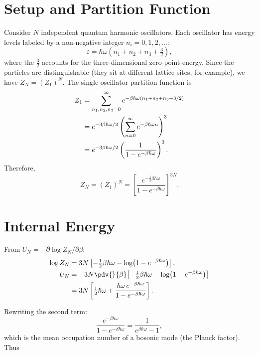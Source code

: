 \section{Setup and Partition Function}

Consider $N$ independent quantum harmonic oscillators.  Each oscillator has energy levels
labeled by a non-negative integer $n_i = 0, 1, 2, \ldots$:
\begin{equation}
    \varepsilon = \hbar\omega\!\left(n_1 + n_2 + n_3 + \tfrac{3}{2}\right),
\end{equation}
where the $\tfrac{3}{2}$ accounts for the three-dimensional zero-point energy.  Since the
particles are distinguishable (they sit at different lattice sites, for example), we have
$Z_N = (Z_1)^N$.  The single-oscillator partition function is
\begin{align}
    Z_1 &= \sum_{n_1,n_2,n_3=0}^{\infty} e^{-\beta\hbar\omega(n_1+n_2+n_3+3/2)} \notag\\
        &= e^{-3\beta\hbar\omega/2} \left(\sum_{n=0}^{\infty} e^{-\beta\hbar\omega n}\right)^3 \notag\\
        &= e^{-3\beta\hbar\omega/2}\left(\frac{1}{1-e^{-\beta\hbar\omega}}\right)^3.
\end{align}
Therefore,
\begin{equation}
    Z_N = (Z_1)^N = \left[\frac{e^{-\frac{1}{2}\beta\hbar\omega}}{1-e^{-\beta\hbar\omega}}\right]^{3N}.
\end{equation}

\section{Internal Energy}

From $U_N = -\partial\log Z_N/\partial\beta$:
\begin{align}
    \log Z_N &= 3N\left[-\tfrac{1}{2}\beta\hbar\omega - \log\!\left(1-e^{-\beta\hbar\omega}\right)\right],\\
    U_N &= -3N\pdv{}{\beta}\!\left[-\tfrac{1}{2}\beta\hbar\omega - \log\!\left(1-e^{-\beta\hbar\omega}\right)\right] \notag\\
        &= 3N\left[\tfrac{1}{2}\hbar\omega + \frac{\hbar\omega\, e^{-\beta\hbar\omega}}{1-e^{-\beta\hbar\omega}}\right].
\end{align}

Rewriting the second term:
\begin{equation}
    \frac{e^{-\beta\hbar\omega}}{1-e^{-\beta\hbar\omega}}
    = \frac{1}{e^{\beta\hbar\omega}-1},
\end{equation}
which is the mean occupation number of a bosonic mode (the Planck factor).  Thus

